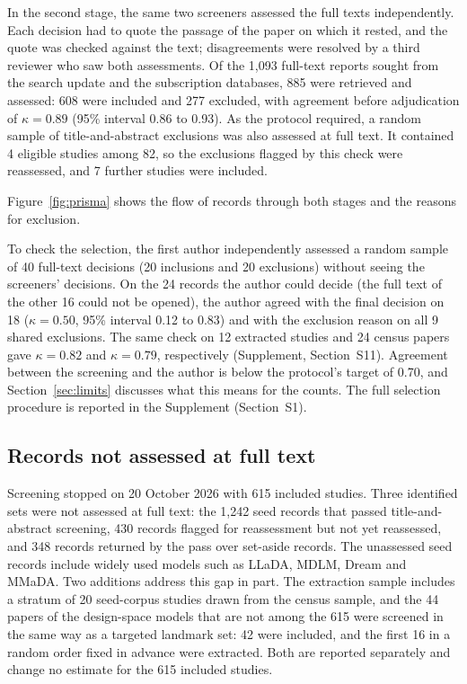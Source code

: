 In the second stage, the same two screeners assessed the full texts independently. Each decision had to quote the passage of the paper on which it rested, and the quote was checked against the text; disagreements were resolved by a third reviewer who saw both assessments. Of the 1,093 full-text reports sought from the search update and the subscription databases, 885 were retrieved and assessed: 608 were included and 277 excluded, with agreement before adjudication of $\kappa=0.89$ (95\% interval 0.86 to 0.93). As the protocol required, a random sample of title-and-abstract exclusions was also assessed at full text. It contained 4 eligible studies among 82, so the exclusions flagged by this check were reassessed, and 7 further studies were included.

Figure~\ref{fig:prisma} shows the flow of records through both stages and the reasons for exclusion.

To check the selection, the first author independently assessed a random sample of 40 full-text decisions (20 inclusions and 20 exclusions) without seeing the screeners' decisions. On the 24 records the author could decide (the full text of the other 16 could not be opened), the author agreed with the final decision on 18 ($\kappa=0.50$, 95\% interval 0.12 to 0.83) and with the exclusion reason on all 9 shared exclusions. The same check on 12 extracted studies and 24 census papers gave $\kappa=0.82$ and $\kappa=0.79$, respectively (Supplement, Section~S11). Agreement between the screening and the author is below the protocol's target of 0.70, and Section~\ref{sec:limits} discusses what this means for the counts. The full selection procedure is reported in the Supplement (Section~S1).

\subsection{Records not assessed at full text}
\label{sec:method-freeze}
Screening stopped on 20 October 2026 with 615 included studies. Three identified sets were not assessed at full text: the 1,242 seed records that passed title-and-abstract screening, 430 records flagged for reassessment but not yet reassessed, and 348 records returned by the pass over set-aside records. The unassessed seed records include widely used models such as LLaDA, MDLM, Dream and MMaDA. Two additions address this gap in part. The extraction sample includes a stratum of 20 seed-corpus studies drawn from the census sample, and the 44 papers of the design-space models that are not among the 615 were screened in the same way as a targeted landmark set: 42 were included, and the first 16 in a random order fixed in advance were extracted. Both are reported separately and change no estimate for the 615 included studies.

